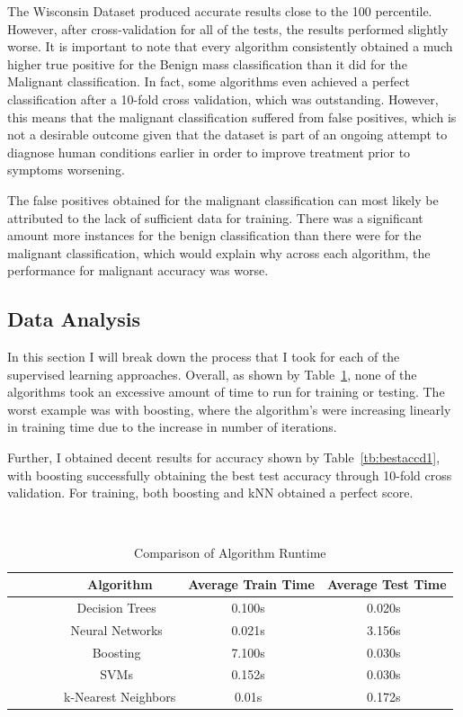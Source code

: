\documentclass[annual]{acmsiggraph}
\begin{document}
The Wisconsin Dataset produced accurate results close to the 100 percentile. However,
after cross-validation for all of the tests, the results performed slightly worse. It
is important to note that every algorithm consistently obtained a much higher true
positive for the Benign mass classification than it did for the Malignant classification.
In fact, some algorithms even achieved a perfect classification after a 10-fold cross
validation, which was outstanding. However, this means that the malignant classification
suffered from false positives, which is not a desirable outcome given that the dataset
is part of an ongoing attempt to diagnose human conditions earlier in order to improve
treatment prior to symptoms worsening.

The false positives obtained for the malignant classification can most likely be attributed
to the lack of sufficient data for training. There was a significant amount more instances
for the benign classification than there were for the malignant classification, which would
explain why across each algorithm, the performance for malignant accuracy was worse.

\subsection{Data Analysis}

In this section I will break down the process that I took for each of the supervised learning
approaches. Overall, as shown by Table~\ref{tb:avgtimed1}, none of the algorithms took an excessive
amount of time to run for training or testing. The worst example was with boosting, where the
algorithm's were increasing linearly in training time due to the increase in number of iterations.

Further, I obtained decent results for accuracy shown by Table~\ref{tb:bestaccd1}, with boosting successfully 
obtaining the best test accuracy through 10-fold cross validation. For training, both boosting and 
kNN obtained a perfect score. 

\begin{table}
    \begin{tabular}{|c|c|c|} \hline
        Algorithm & Average Train Time & Average Test Time  \\ \hline
        Decision Trees & 0.100s & 0.020s \\
        Neural Networks & 0.021s & 3.156s \\
        Boosting & 7.100s & 0.030s \\
        SVMs & 0.152s & 0.030s \\
        k-Nearest Neighbors  & 0.01s & 0.172s \\
	\hline \end{tabular}
	\caption {Comparison of Algorithm Runtime} \label{tab:avgtimed1title}
	\label{tb:avgtimed1}
\end{table}
\end{document}
